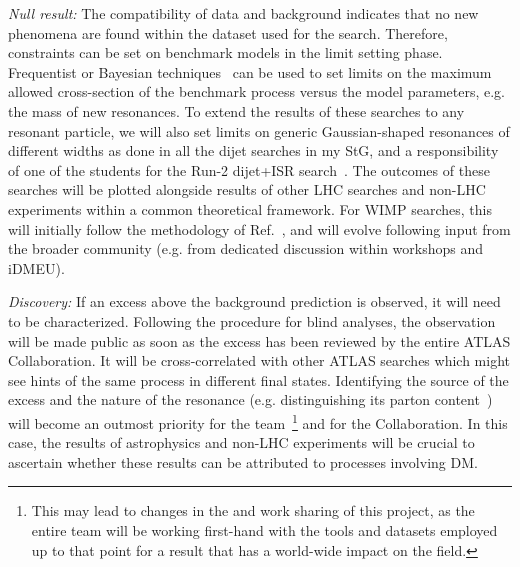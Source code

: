 \textit{Null result:} The compatibility of data and background indicates that no new phenomena are found within the dataset used for the search. 
Therefore, constraints can be set on benchmark models in the limit setting phase. 
Frequentist or Bayesian techniques~\cite{ToBeCited} %
can be used to set limits on the maximum allowed cross-section of the benchmark process versus the model parameters, e.g. the mass of new resonances. 
To extend the results of these searches to any resonant particle, we will also set limits on generic Gaussian-shaped resonances of different widths as done in all the dijet searches in my StG, and a responsibility of one of the students for the Run-2 dijet+ISR search~\cite{ToBeCited}. %
The outcomes of these searches will be plotted alongside results of other LHC searches and non-LHC experiments within a common theoretical framework. 
For WIMP searches, this will initially follow the methodology of Ref.~\cite{ToBeCited}, %
and will evolve following input from the broader community (e.g. from dedicated discussion within workshops and iDMEU). 

\textit{Discovery:} If an excess above the background prediction is observed, it will need to be characterized. 
Following the procedure for blind analyses, the observation will be made public as soon as the excess has been reviewed by the entire ATLAS Collaboration. 
It will be cross-correlated with other ATLAS searches which might see hints of the same process in different final states. 
Identifying the source of the excess and the nature of the resonance (e.g. distinguishing its parton content~\cite{ToBeCited}) %
will become an outmost priority for the team~\footnote{This may lead to changes in the and work sharing of this project, as the entire team will be working first-hand with the tools and datasets employed up to that point for a result that has a world-wide impact on the field.} and for the Collaboration. 
In this case, the results of astrophysics and non-LHC experiments will be crucial to ascertain whether these results can be attributed to processes involving DM.

